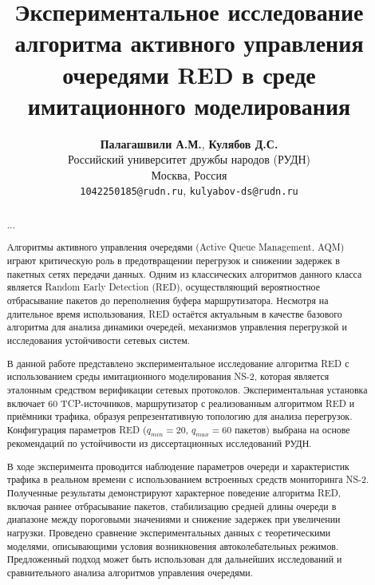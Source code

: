 \documentclass[10pt, conference, twocolumn, a4paper]{article}
\title{Экспериментальное исследование алгоритма активного управления очередями RED в среде имитационного моделирования}
\author{
    \textbf{Палагашвили А.М.}, \textbf{Кулябов Д.С.} \\
    Российский университет дружбы народов (РУДН) \\
    Москва, Россия \\
    \texttt{1042250185@rudn.ru}, \texttt{kulyabov-ds@rudn.ru}
}
\date{}
\begin{document}
\maketitle

{
\renewcommand{\thefootnote}{}
}

\begin{abstract}
...
\end{abstract}
\begin{abstract}
Алгоритмы активного управления очередями (Active Queue Management, AQM) играют критическую роль в предотвращении перегрузок и снижении задержек в пакетных сетях передачи данных. Одним из классических алгоритмов данного класса является Random Early Detection (RED), осуществляющий вероятностное отбрасывание пакетов до переполнения буфера маршрутизатора. Несмотря на длительное время использования, RED остаётся актуальным в качестве базового алгоритма для анализа динамики очередей, механизмов управления перегрузкой и исследования устойчивости сетевых систем.

В данной работе представлено экспериментальное исследование алгоритма RED с использованием среды имитационного моделирования NS-2, которая является эталонным средством верификации сетевых протоколов. Экспериментальная установка включает 60 TCP-источников, маршрутизатор с реализованным алгоритмом RED и приёмники трафика, образуя репрезентативную топологию для анализа перегрузок. Конфигурация параметров RED ($q_{min}=20$, $q_{max}=60$ пакетов) выбрана на основе рекомендаций по устойчивости из диссертационных исследований РУДН.

В ходе эксперимента проводится наблюдение параметров очереди и характеристик трафика в реальном времени с использованием встроенных средств мониторинга NS-2. Полученные результаты демонстрируют характерное поведение алгоритма RED, включая раннее отбрасывание пакетов, стабилизацию средней длины очереди в диапазоне между пороговыми значениями и снижение задержек при увеличении нагрузки. Проведено сравнение экспериментальных данных с теоретическими моделями, описывающими условия возникновения автоколебательных режимов. Предложенный подход может быть использован для дальнейших исследований и сравнительного анализа алгоритмов управления очередями.
\end{abstract}
\end{document}
